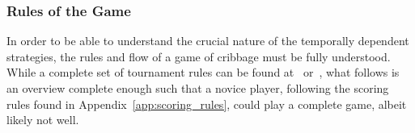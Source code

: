 
\subsubsection*{Rules of the Game}

In order to be able to understand the crucial nature of the temporally dependent
strategies, the rules and flow of a game of cribbage must be fully understood.
%
While a complete set of tournament rules can be found at~\cite{ACC_rules}
or~\cite{ACC_rulebook},
what follows is an overview complete enough such that a novice player,
following the scoring rules found in Appendix~\ref{app:scoring_rules},
could play a complete game, albeit likely not well.

